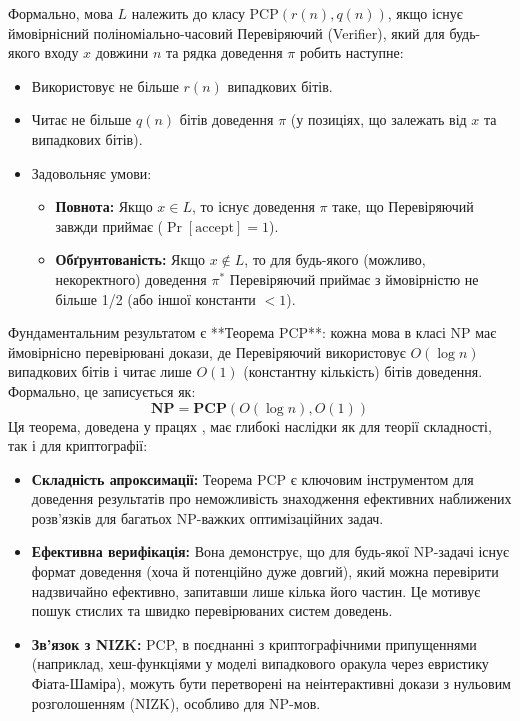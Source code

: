 \documentclass[a4paper,12pt]{article}
\begin{document}
    Формально, мова \(L\) належить до класу \(\text{PCP}(r(n), q(n))\), якщо існує ймовірнісний поліноміально-часовий Перевіряючий (Verifier), який для будь-якого входу \(x\) довжини \(n\) та рядка доведення \(\pi\) робить наступне:
    \begin{itemize}
        \item Використовує не більше \(r(n)\) випадкових бітів.
        \item Читає не більше \(q(n)\) бітів доведення \(\pi\) (у позиціях, що залежать від \(x\) та випадкових бітів).
        \item Задовольняє умови:
        \begin{itemize}
            \item \textbf{Повнота:} Якщо \(x \in L\), то існує доведення \(\pi\) таке, що Перевіряючий завжди приймає (\(\Pr[\text{accept}] = 1\)).
            \item \textbf{Обґрунтованість:} Якщо \(x \notin L\), то для будь-якого (можливо, некоректного) доведення \(\pi^*\) Перевіряючий приймає з ймовірністю не більше 1/2 (або іншої константи \(< 1\)).
        \end{itemize}
    \end{itemize}

    Фундаментальним результатом є **Теорема PCP**: кожна мова в класі NP має ймовірнісно перевірювані докази, де Перевіряючий використовує \(O(\log n)\) випадкових бітів і читає лише \(O(1)\) (константну кількість) бітів доведення. Формально, це записується як:
    \[ \mathbf{NP} = \mathbf{PCP}(O(\log n), O(1)) \]
    Ця теорема, доведена у працях \cite{arora1998probabilistic, arora1998proof}, має глибокі наслідки як для теорії складності, так і для криптографії:
    \begin{itemize}
        \item \textbf{Складність апроксимації:} Теорема PCP є ключовим інструментом для доведення результатів про неможливість знаходження ефективних наближених розв'язків для багатьох NP-важких оптимізаційних задач.
        \item \textbf{Ефективна верифікація:} Вона демонструє, що для будь-якої NP-задачі існує формат доведення (хоча й потенційно дуже довгий), який можна перевірити надзвичайно ефективно, запитавши лише кілька його частин. Це мотивує пошук стислих та швидко перевірюваних систем доведень.
        \item \textbf{Зв'язок з NIZK:} PCP, в поєднанні з криптографічними припущеннями (наприклад, хеш-функціями у моделі випадкового оракула через евристику Фіата-Шаміра), можуть бути перетворені на неінтерактивні докази з нульовим розголошенням (NIZK), особливо для NP-мов.
    \end{itemize}
\end{document}
